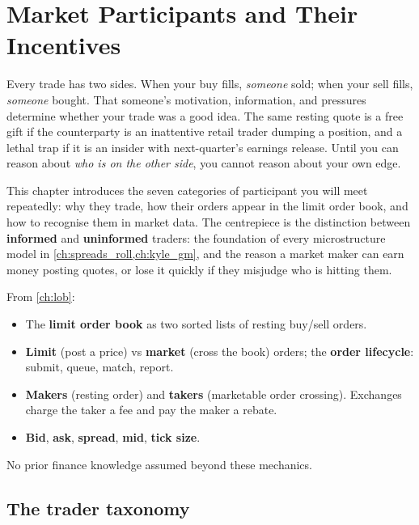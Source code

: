 \chapter{Market Participants and Their Incentives}
\label{ch:participants}

Every trade has two sides. When your buy fills, \emph{someone} sold;
when your sell fills, \emph{someone} bought. That someone's motivation,
information, and pressures determine whether your trade was a good
idea. The same resting quote is a free gift if the counterparty is an
inattentive retail trader dumping a position, and a lethal trap if it
is an insider with next-quarter's earnings release. Until you can
reason about \emph{who is on the other side}, you cannot reason about
your own edge.

This chapter introduces the seven categories of participant you will
meet repeatedly: why they trade, how their orders appear in the limit
order book, and how to recognise them in market data. The centrepiece
is the distinction between \textbf{informed} and \textbf{uninformed}
traders: the foundation of every microstructure model in
\cref{ch:spreads_roll,ch:kyle_gm}, and the reason a market maker can
earn money posting quotes, or lose it quickly if they misjudge who is
hitting them.

\begin{backgroundbox}[Prerequisites]
From \cref{ch:lob}:
\begin{itemize}
  \item The \textbf{limit order book} as two sorted lists of resting
  buy/sell orders.
  \item \textbf{Limit} (post a price) vs \textbf{market} (cross the
  book) orders; the \textbf{order lifecycle}: submit, queue, match,
  report.
  \item \textbf{Makers} (resting order) and \textbf{takers} (marketable
  order crossing). Exchanges charge the taker a fee and pay the maker
  a rebate.
  \item \textbf{Bid}, \textbf{ask}, \textbf{spread}, \textbf{mid},
  \textbf{tick size}.
\end{itemize}
No prior finance knowledge assumed beyond these mechanics.
\end{backgroundbox}

\section{The trader taxonomy}
\label{sec:taxonomy}

